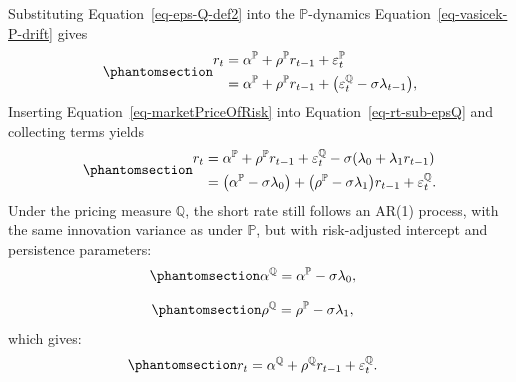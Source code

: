 \documentclass[
  letterpaper,
  DIV=11,
  numbers=noendperiod]{scrreprt}
\begin{document}
Substituting Equation~\ref{eq-eps-Q-def2} into the
\(\mathbb{P}\)-dynamics Equation~\ref{eq-vasicek-P-drift} gives
\begin{equation}\protect\phantomsection\label{eq-rt-sub-epsQ}{
\begin{align}
    r_t 
    &= \alpha^{\mathbb{P}} + \rho^{\mathbb{P}} r_{t-1} + \varepsilon_t^{\mathbb{P}} \nonumber \\
    &= \alpha^{\mathbb{P}} + \rho^{\mathbb{P}} r_{t-1} 
        + \big( \varepsilon_t^{\mathbb{Q}} - \sigma \lambda_{t-1} \big),
\end{align}
}\end{equation} Inserting Equation~\ref{eq-marketPriceOfRisk} into
Equation~\ref{eq-rt-sub-epsQ} and collecting terms yields
\begin{equation}\protect\phantomsection\label{eq-rt-Q-ar1}{
\begin{align}
    r_t
    &= \alpha^{\mathbb{P}} + \rho^{\mathbb{P}} r_{t-1} 
        + \varepsilon_t^{\mathbb{Q}} - \sigma (\lambda_0 + \lambda_1 r_{t-1}) \nonumber \\
    &= \big(\alpha^{\mathbb{P}} - \sigma \lambda_0\big) 
        + \big(\rho^{\mathbb{P}} - \sigma \lambda_1\big) r_{t-1}
        + \varepsilon_t^{\mathbb{Q}}.
\end{align}
}\end{equation} Under the pricing measure \(\mathbb{Q}\), the short rate
still follows an AR(1) process, with the same innovation variance as
under \(\mathbb{P}\), but with risk-adjusted intercept and persistence
parameters:
\begin{equation}\protect\phantomsection\label{eq-alphaQ-def}{
\begin{align}
    \alpha^{\mathbb{Q}} &= \alpha^{\mathbb{P}} - \sigma \lambda_0, 
\end{align}
}\end{equation}

\begin{equation}\protect\phantomsection\label{eq-rhoQ-def}{
\begin{align}
    \rho^{\mathbb{Q}}   &= \rho^{\mathbb{P}} - \sigma \lambda_1,
\end{align}
}\end{equation} which gives:
\begin{equation}\protect\phantomsection\label{eq-vasicek-Q-drift-ar1}{
\begin{align}
    r_t &= \alpha^{\mathbb{Q}} + \rho^{\mathbb{Q}} r_{t-1} + \varepsilon_t^{\mathbb{Q}}.
\end{align}
}\end{equation}
\end{document}
